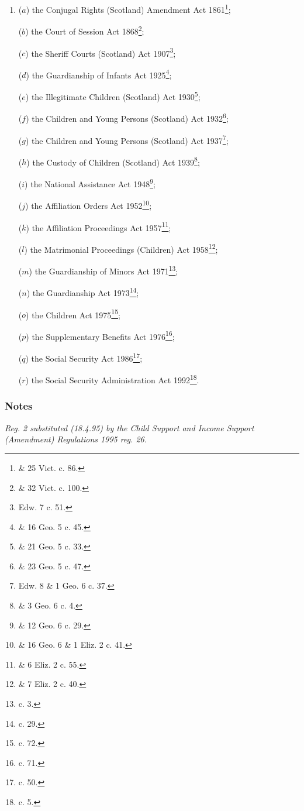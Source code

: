 \documentclass[a4paper]{article}
\newcommand\amendment[1]{\subsubsection*{Notes}{\itshape\frenchspacing\footnotesize #1 \par}}
\begin{document}
\begin{enumerate}\item[]
($a$) the Conjugal Rights (Scotland) Amendment Act 1861\footnote{ \& 25 Vict. c. 86.};

($b$) the Court of Session Act 1868\footnote{ \& 32 Vict. c. 100.};

($c$) the Sheriff Courts (Scotland) Act 1907\footnote{ Edw. 7 c. 51.};

($d$) the Guardianship of Infants Act 1925\footnote{ \& 16 Geo. 5 c. 45.};

($e$) the Illegitimate Children (Scotland) Act 1930\footnote{ \& 21 Geo. 5 c. 33.};

($f$) the Children and Young Persons (Scotland) Act 1932\footnote{ \& 23 Geo. 5 c. 47.};

($g$) the Children and Young Persons (Scotland) Act 1937\footnote{ Edw. 8 \& 1 Geo. 6 c. 37.};

($h$) the Custody of Children (Scotland) Act 1939\footnote{ \& 3 Geo. 6 c. 4.};

($i$) the National Assistance Act 1948\footnote{ \& 12 Geo. 6 c. 29.};

($j$) the Affiliation Orders Act 1952\footnote{ \& 16 Geo. 6 \& 1 Eliz. 2 c. 41.};

($k$) the Affiliation Proceedings Act 1957\footnote{ \& 6 Eliz. 2 c. 55.};

($l$) the Matrimonial Proceedings (Children) Act 1958\footnote{ \& 7 Eliz. 2 c. 40.};

($m$) the Guardianship of Minors Act 1971\footnote{ c. 3.};

($n$) the Guardianship Act 1973\footnote{ c. 29.};

($o$) the Children Act 1975\footnote{ c. 72.};

($p$) the Supplementary Benefits Act 1976\footnote{ c. 71.};

($q$) the Social Security Act 1986\footnote{ c. 50.};

($r$) the Social Security Administration Act 1992\footnote{ c. 5.}.
\end{enumerate}

\amendment{
Reg. 2 substituted (18.4.95) by the Child Support and Income Support (Amendment) Regulations 1995 reg. 26.
}
\end{document}
